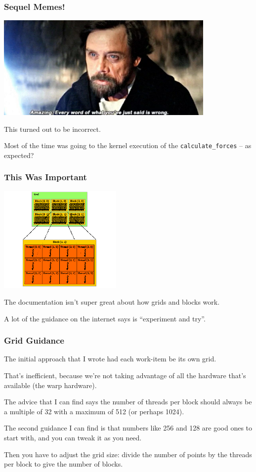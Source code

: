 \begin{frame}
\frametitle{Sequel Memes!}

\begin{center}
	\includegraphics[width=0.8\textwidth]{images/wrong.png}
\end{center}

This turned out to be incorrect.

Most of the time was going to the kernel execution of the \texttt{calculate\_forces} -- as expected?

\end{frame}


\begin{frame}
\frametitle{This Was Important}

\begin{center}
	\includegraphics[width=0.45\textwidth]{images/grid-of-thread-blocks.png}
\end{center}

The documentation isn't super great about how grids and blocks work.

A lot of the guidance on the internet says is ``experiment and try''. 

\end{frame}


\begin{frame}
\frametitle{Grid Guidance}

 The initial approach that I wrote had each work-item be its own grid. 
 
 That's inefficient, because we're not taking advantage of all the hardware that's available (the warp hardware). 
 
 The advice that I can find says the number of threads per block should always be a multiple of 32 with a maximum of 512 (or perhaps 1024). 
 
 The second guidance I can find is that numbers like 256 and 128 are good ones to start with, and you can tweak it as you need. 
 
 Then you have to adjust the grid size: divide the number of points by the threads per block to give the number of blocks.

\end{frame}


